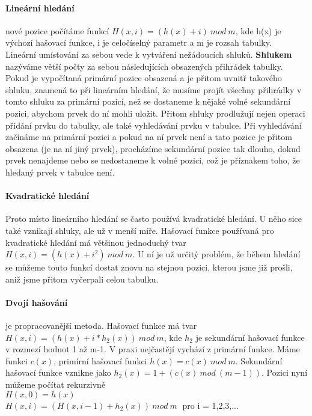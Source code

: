 \documentclass[10pt,a4paper]{article}
\begin{document}
\paragraph{Lineární hledání}
nové pozice počítáme funkcí $H(x, i) = (h(x) + i)\:mod\:m$, kde h(x) je výchozí hašovací funkce, i je celočíselný parametr a m je rozsah tabulky. \\
Lineární umísťování za sebou vede k vytváření nežádoucích shluků. \textbf{Shlukem} nazýváme větší počty za sebou následujících obsazených přihrádek tabulky. Pokud je vypočítaná primární pozice obsazená a je přitom uvnitř takového shluku, znamená to při lineárním hledání, že musíme projít všechny přihrádky v tomto shluku za primární pozicí, než se dostaneme k nějaké volné sekundární pozici, abychom prvek do ní mohli uložit. Přitom shluky prodlužují nejen operaci přidání prvku do tabulky, ale také vyhledávání prvku v tabulce. Při vyhledávání začínáme na primární pozici a pokud na ní prvek není a tato pozice je přitom obsazena (je na ní jiný prvek), procházíme sekundární pozice tak dlouho, dokud prvek nenajdeme nebo se nedostaneme k volné pozici, což je příznakem toho, že hledaný prvek v tabulce není.
\paragraph{Kvadratické hledání}
Proto místo lineárního hledání se často používá kvadratické hledání. U něho sice také vznikají shluky, ale už v menší míře. Hašovací funkce používaná pro kvadratické hledání má většinou jednoduchý tvar $H(x, i) = (h(x) + i^2 )\:mod\:m$. U ní je už určitý problém, že během hledání se můžeme touto funkcí dostat znovu na stejnou pozici, kterou jsme již prošli, aniž jsme přitom vyčerpali celou tabulku.
\paragraph{Dvojí hašování}
je propracovanější metoda. Hašovací funkce má tvar $H(x, i) = (h(x) + i \ast h_2(x))\:mod\:m$, kde $h_2$ je sekundární hašovací funkce v rozmezí hodnot 1 až m-1. V praxi nejčastějí vychází z primární funkce. Máme funkci $c(x)$, primírní hašovací funkci $h(x) = c(x)\:mod\:m$. Sekundární hašovací funkce vznikne jako $h_2(x) = 1 + (c(x)\:mod\:(m -1))$. Pozici nyní můžeme počítat rekurzivně \\
$H(x,0) = h(x)$ \\ $H(x, i) = (H(x, i-1) + h_2(x))\:mod\:m\;$	pro i = 1,2,3,...
\end{document}
